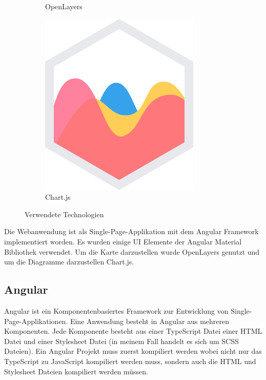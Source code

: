 \documentclass[a4paper,12pt]{article}
\begin{document}
\begin{figure}[H]
\begin{subfigure}[b]{0.3\linewidth}
        \caption{OpenLayers}
    \end{subfigure}
    \begin{subfigure}[b]{0.3\linewidth}
        \includegraphics[width=0.8\linewidth]{assets/chartjs.png}
        \caption{Chart.js}
    \end{subfigure}
    \caption{Verwendete Technologien}
    \label{fig:technoligies}
\end{figure}

Die Webanwendung ist als Single-Page-Applikation mit dem Angular Framework
implementiert worden. Es wurden einige UI Elemente der Angular Material
Bibliothek verwendet. Um die Karte darzustellen wurde OpenLayers genutzt und um
die Diagramme darzustellen Chart.js.

\subsection{Angular}
Angular ist ein Komponentenbasiertes Framework zur Entwicklung von
Single-Page-Applikationen. Eine Anwendung besteht in Angular aus mehreren
Komponenten. Jede Komponente besteht aus einer TypeScript Datei einer HTML Datei
und einer Stylesheet Datei (in meinem Fall handelt es sich um SCSS Dateien). Ein
Angular Projekt muss zuerst kompiliert werden wobei nicht nur das TypeScript zu
JavaScript kompiliert werden muss, sondern auch die HTML und Stylesheet Dateien
kompiliert werden müssen.
\end{document}
